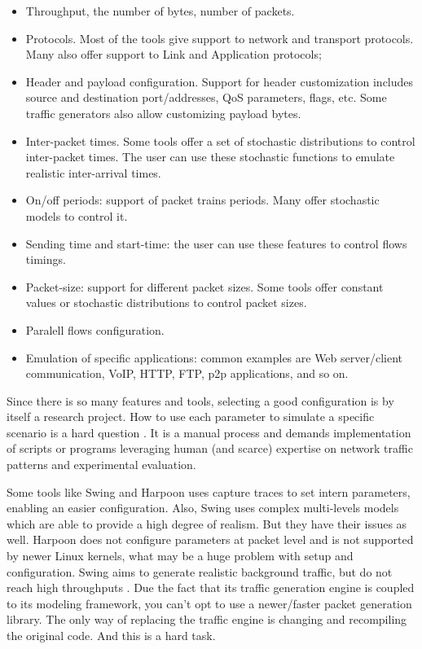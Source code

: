 \begin{itemize}


\item Throughput, the number of bytes, number of packets.


\item Protocols. Most of the tools give support to network and transport protocols. Many also offer support to Link and Application protocols;


\item Header and payload configuration. Support for header customization includes source and destination port/addresses, QoS parameters, flags, etc. Some traffic generators also allow customizing payload bytes.


\item Inter-packet times. Some tools offer a set of stochastic distributions to control inter-packet times. The user can use these stochastic functions to emulate realistic inter-arrival times.


\item On/off periods: support of packet trains periods. Many offer stochastic models to control it. 


\item Sending time and start-time: the user can use these features to control flows timings.  


\item Packet-size: support for different packet sizes. Some tools offer constant values or stochastic distributions to control packet sizes.


\item Paralell flows configuration.


\item Emulation of specific applications: common examples are Web server/client communication, VoIP, HTTP, FTP, p2p applications, and so on.

\end{itemize}


Since there is so many features and tools, selecting a good configuration is by itself a research project. How to use each parameter to simulate a specific scenario is a hard question \cite{legotg-paper}\cite{selfsimilar-ethernet}. It is a manual process and demands implementation of scripts or programs leveraging human (and scarce) expertise on network traffic patterns and experimental evaluation.


Some tools like Swing and Harpoon uses capture traces to set intern parameters, enabling an easier configuration. Also, Swing uses complex multi-levels models which are able to provide a high degree of realism\cite{swing-paper}. But they have their issues as well. Harpoon does not configure parameters at packet level\cite{harpoon-paper} and is not supported by newer Linux kernels, what may be a huge problem with setup and configuration. Swing\cite{swing-paper} aims to generate realistic background traffic, but do not reach high throughputs \cite{swing-paper} \cite{legotg-paper}. Due the fact that its traffic generation engine is coupled to its modeling framework, you can't opt to use a newer/faster packet generation library. The only way of replacing the traffic engine is changing and recompiling the original code. And this is a hard task.


